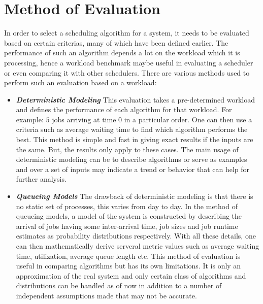 \section{Method of Evaluation}
In order to select a scheduling algorithm for a system, it needs to be evaluated based on certain criterias, many of which have been defined earlier. The performance of such an algorithm depends a lot on the workload which it is processing, hence a workload benchmark maybe useful in evaluating a scheduler or even comparing it with other schedulers. There are various methods used to perform such an evaluation based on a workload\cite{galvin}:
\begin{itemize}
\item \textbf{\textit{Deterministic Modeling}} This evaluation takes a pre-determined workload and defines the performance of each algorithm for that workload. For example: $5$ jobs arriving at time $0$ in a particular order. One can then use a criteria such as average waiting time to find which algorithm performs the best. This method is simple and fast in giving exact results if the inputs are the same. But, the results only apply to these cases. The main usage of deterministic modeling can be to describe algorithms or serve as examples and over a set of inputs may indicate a trend or behavior that can help for further analysis. 
\item \textbf{\textit{Queueing Models}} The drawback of deterministic modeling is that there is no static set of processes, this varies from day to day. In the method of queueing models, a model of the system is constructed by describing the arrival of jobs having some inter-arrival time, job sizes and job runtime estimates as probability distributions respectively. With all these details, one can then mathematically derive serveral metric values such as average waiting time, utilization, average queue length etc. This method of evaluation is useful in comparing algorithms but has its own limitations. It is only an approximation of the real system and only certain class of algorithms and distributions can be handled as of now in addition to a number of independent assumptions made that may not be accurate.

\end{itemize}

